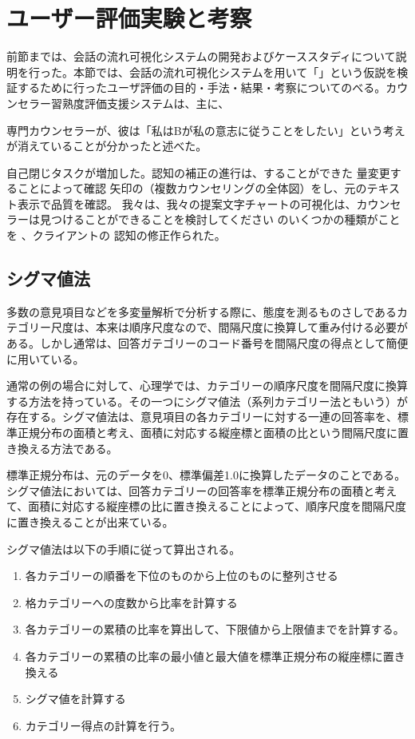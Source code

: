 \documentclass[shuuron]{kuee}
\begin{document}
\section{ユーザー評価実験と考察}

前節までは、会話の流れ可視化システムの開発およびケーススタディについて説明を行った。本節では、会話の流れ可視化システムを用いて「」という仮説を検証するために行ったユーザ評価の目的・手法・結果・考察についてのべる。カウンセラー習熟度評価支援システムは、主に、





  専門カウンセラーが、彼は「私はBが私の意志に従うことをしたい」という考えが消えていることが分かったと述べた。

自己閉じタスクが増加した。認知の補正の進行は、することができた 量変更することによって確認 矢印の（複数カウンセリングの全体図）をし、元のテキスト表示で品質を確認。 我々は、我々の提案文字チャートの可視化は、カウンセラーは見つけることができることを検討してください のいくつかの種類がことを 、クライアントの 認知の修正作られた。

\subsection{シグマ値法}
多数の意見項目などを多変量解析で分析する際に、態度を測るものさしであるカテゴリー尺度は、本来は順序尺度なので、間隔尺度に換算して重み付ける必要がある。しかし通常は、回答ガテゴリーのコード番号を間隔尺度の得点として簡便に用いている。

通常の例の場合に対して、心理学では、カテゴリーの順序尺度を間隔尺度に換算する方法を持っている。その一つにシグマ値法（系列カテゴリー法ともいう）が存在する。シグマ値法は、意見項目の各カテゴリーに対する一連の回答率を、標準正規分布の面積と考え、面積に対応する縦座標と面積の比という間隔尺度に置き換える方法である。

標準正規分布は、元のデータを0、標準偏差1.0に換算したデータのことである。シグマ値法においては、回答カテゴリーの回答率を標準正規分布の面積と考えて、面積に対応する縦座標の比に置き換えることによって、順序尺度を間隔尺度に置き換えることが出来ている。

シグマ値法は以下の手順に従って算出される。
\begin{enumerate}
 \item 各カテゴリーの順番を下位のものから上位のものに整列させる
 \item 格カテゴリーへの度数から比率を計算する
 \item 各カテゴリーの累積の比率を算出して、下限値から上限値までを計算する。
 \item 各カテゴリーの累積の比率の最小値と最大値を標準正規分布の縦座標に置き換える
 \item シグマ値を計算する
 \item カテゴリー得点の計算を行う。
\end{enumerate}
\end{document}
